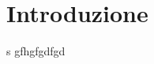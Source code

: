 \documentclass[$SRC/main]{subfiles}
\begin{document}
\section{Introduzione} \label{sec:introduzione}
s
gfhgfgdfgd
\end{document}
